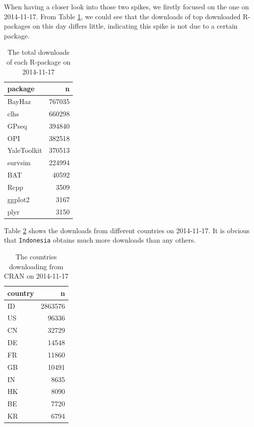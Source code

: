 \documentclass[
]{book}
\begin{document}
When having a closer look into those two spikes, we firstly focused on the one on 2014-11-17. From Table \ref{tab:spike14count}, we could see that the downloads of top downloaded R-packages on this day differs little, indicating this spike is not due to a certain package.

\begin{table}

\caption{\label{tab:spike14count}The total downloads of each R-package on 2014-11-17}
\centering
\begin{tabular}[t]{l|r}
\hline
package & n\\
\hline
BayHaz & 767035\\
\hline
clhs & 660298\\
\hline
GPseq & 394840\\
\hline
OPI & 382518\\
\hline
YaleToolkit & 370513\\
\hline
survsim & 224994\\
\hline
BAT & 40592\\
\hline
Rcpp & 3509\\
\hline
ggplot2 & 3167\\
\hline
plyr & 3150\\
\hline
\end{tabular}
\end{table}

Table \ref{tab:spike14country} shows the downloads from different countries on 2014-11-17. It is obvious that \texttt{Indonesia} obtains much more downloads than any others.

\begin{table}

\caption{\label{tab:spike14country}The countries downloading from CRAN on 2014-11-17}
\centering
\begin{tabular}[t]{l|r}
\hline
country & n\\
\hline
ID & 2863576\\
\hline
US & 96336\\
\hline
CN & 32729\\
\hline
DE & 14548\\
\hline
FR & 11860\\
\hline
GB & 10491\\
\hline
IN & 8635\\
\hline
HK & 8090\\
\hline
BE & 7720\\
\hline
KR & 6794\\
\hline
\end{tabular}
\end{table}
\end{document}
